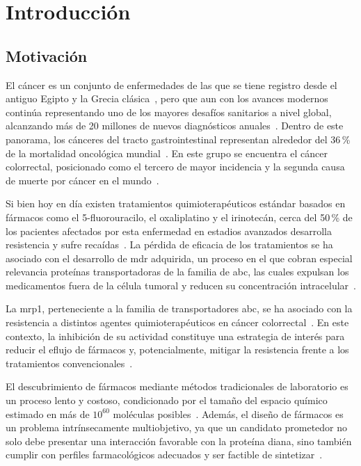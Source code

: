 \chapter{Introducción}
\label{ch:introduccion}

\section{Motivación}
\label{sec:motivacion}

El cáncer es un conjunto de enfermedades de las que se tiene registro desde el antiguo Egipto y la Grecia clásica~\cite{acs2026historia}, pero que aun con los avances modernos continúa representando uno de los mayores desafíos sanitarios a nivel global, alcanzando más de 20 millones de nuevos diagnósticos anuales~\cite{sung2026global}. Dentro de este panorama, los cánceres del tracto gastrointestinal representan alrededor del 36\,\% de la mortalidad oncológica mundial~\cite{marin2022expression}. En este grupo se encuentra el cáncer colorrectal, posicionado como el tercero de mayor incidencia y la segunda causa de muerte por cáncer en el mundo~\cite{sung2026global}. 

Si bien hoy en día existen tratamientos quimioterapéuticos estándar basados en fármacos como el 5-fluorouracilo, el oxaliplatino y el irinotecán, cerca del 50\,\% de los pacientes afectados por esta enfermedad en estadios avanzados desarrolla resistencia y sufre recaídas~\cite{abdallah2016, marin2022expression, qi2020long}. La pérdida de eficacia de los tratamientos se ha asociado con el desarrollo de \gls{mdr} adquirida, un proceso en el que cobran especial relevancia proteínas transportadoras de la familia de \gls{abc}, las cuales expulsan los medicamentos fuera de la célula tumoral y reducen su concentración intracelular~\cite{abdallah2016, marin2022expression, qi2020long}.
 
La \gls{mrp1}, perteneciente a la familia de transportadores \gls{abc}, se ha asociado con la resistencia a distintos agentes quimioterapéuticos en cáncer colorrectal~\cite{abdallah2016, cao2017role, qi2020long}. En este contexto, la inhibición de su actividad constituye una estrategia de interés para reducir el eflujo de fármacos y, potencialmente, mitigar la resistencia frente a los tratamientos convencionales~\cite{cao2017role}.

El descubrimiento de fármacos mediante métodos tradicionales de laboratorio es un proceso lento y costoso, condicionado por el tamaño del espacio químico estimado en más de $10^{60}$ moléculas posibles~\cite{das2025generative, luukkonen2023artificial}. Además, el diseño de fármacos es un problema intrínsecamente multiobjetivo, ya que un candidato prometedor no solo debe presentar una interacción favorable con la proteína diana, sino también cumplir con perfiles farmacológicos adecuados y ser factible de sintetizar~\cite{luukkonen2023artificial, zhang2026molecular}.

